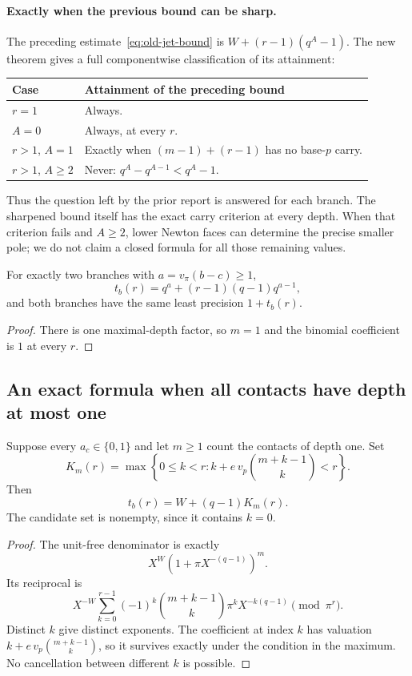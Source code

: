 \paragraph{Exactly when the previous bound can be sharp.}
The preceding estimate~\eqref{eq:old-jet-bound} is $W+(r-1)(q^A-1)$. The new theorem gives a full componentwise classification of its attainment:

\begin{center}\small
\begin{tabular}{ll}
\toprule
Case & Attainment of the preceding bound\\
\midrule
$r=1$ & Always.\\
$A=0$ & Always, at every $r$.\\
$r>1$, $A=1$ & Exactly when $(m-1)+(r-1)$ has no base-$p$ carry.\\
$r>1$, $A\ge2$ & Never: $q^A-q^{A-1}<q^A-1$.\\
\bottomrule
\end{tabular}
\end{center}

Thus the question left by the prior report is answered for each branch. The sharpened bound itself has the exact carry criterion at every depth. When that criterion fails and $A\ge2$, lower Newton faces can determine the precise smaller pole; we do not claim a closed formula for all those remaining values.

\begin{corollary}\label{cor:two-branches}
For exactly two branches with $a=v_\pi(b-c)\ge1$,
\[
 t_b(r)=q^a+(r-1)(q-1)q^{a-1},
\]
and both branches have the same least precision $1+t_b(r)$.
\end{corollary}
\begin{proof}
There is one maximal-depth factor, so $m=1$ and the binomial coefficient is $1$ at every $r$.
\end{proof}

\subsection{An exact formula when all contacts have depth at most one}

\begin{theorem}\label{thm:depth-one}
Suppose every $a_c\in\{0,1\}$ and let $m\ge1$ count the contacts of depth one. Set
\[
 K_m(r)=\max\left\{0\le k<r:
 k+e\,v_p\binom{m+k-1}{k}<r\right\}.
\]
Then
\begin{equation}\label{eq:exact-depth-one}
 \boxed{\quad t_b(r)=W+(q-1)K_m(r).\quad}
\end{equation}
The candidate set is nonempty, since it contains $k=0$.
\end{theorem}
\begin{proof}
The unit-free denominator is exactly
\[
 X^W(1+\pi X^{-(q-1)})^m.
\]
Its reciprocal is
\[
 X^{-W}\sum_{k=0}^{r-1}(-1)^k
 \binom{m+k-1}{k}\pi^kX^{-k(q-1)}
 \pmod{\pi^r}.
\]
Distinct $k$ give distinct exponents. The coefficient at index $k$ has valuation
$k+e\,v_p\binom{m+k-1}{k}$, so it survives exactly under the condition in the maximum. No cancellation between different $k$ is possible.
\end{proof}

